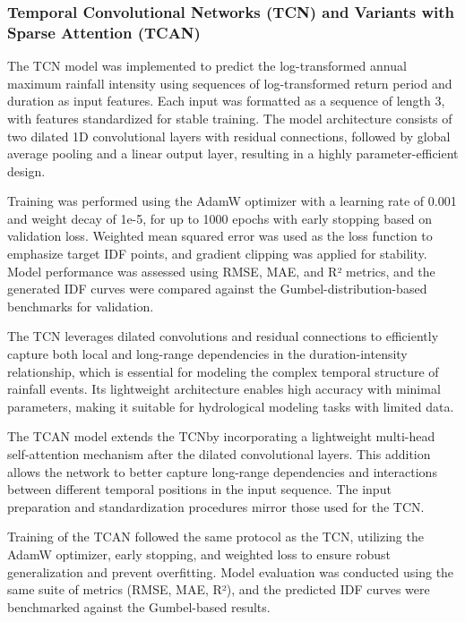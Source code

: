 \subsubsection{Temporal Convolutional Networks (TCN) and Variants with Sparse Attention (TCAN)}

The TCN model was implemented to predict the log-transformed annual maximum rainfall intensity using sequences of log-transformed return period and duration as input features. Each input was formatted as a sequence of length 3, with features standardized for stable training. The model architecture consists of two dilated 1D convolutional layers with residual connections, followed by global average pooling and a linear output layer, resulting in a highly parameter-efficient design.

\vspace{1em}

Training was performed using the AdamW optimizer with a learning rate of 0.001 and weight decay of 1e-5, for up to 1000 epochs with early stopping based on validation loss. Weighted mean squared error was used as the loss function to emphasize target IDF points, and gradient clipping was applied for stability. Model performance was assessed using RMSE, MAE, and R² metrics, and the generated IDF curves were compared against the Gumbel-distribution-based benchmarks for validation.

\vspace{1em}

The TCN leverages dilated convolutions and residual connections to efficiently capture both local and long-range dependencies in the duration-intensity relationship, which is essential for modeling the complex temporal structure of rainfall events. Its lightweight architecture enables high accuracy with minimal parameters, making it suitable for hydrological modeling tasks with limited data.

\vspace{1em}

The TCAN model extends the TCN\@ by incorporating a lightweight multi-head self-attention mechanism after the dilated convolutional layers. This addition allows the network to better capture long-range dependencies and interactions between different temporal positions in the input sequence. The input preparation and standardization procedures mirror those used for the TCN\@.

\vspace{1em}

Training of the TCAN followed the same protocol as the TCN, utilizing the AdamW optimizer, early stopping, and weighted loss to ensure robust generalization and prevent overfitting. Model evaluation was conducted using the same suite of metrics (RMSE, MAE, R²), and the predicted IDF curves were benchmarked against the Gumbel-based results.

